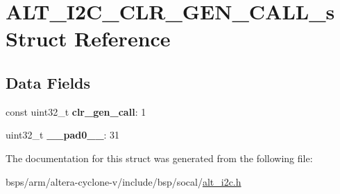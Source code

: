 \hypertarget{structALT__I2C__CLR__GEN__CALL__s}{}\section{A\+L\+T\+\_\+\+I2\+C\+\_\+\+C\+L\+R\+\_\+\+G\+E\+N\+\_\+\+C\+A\+L\+L\+\_\+s Struct Reference}
\label{structALT__I2C__CLR__GEN__CALL__s}
\subsection*{Data Fields}
\begin{DoxyCompactItemize}
\item 
\mbox{\label{structALT__I2C__CLR__GEN__CALL__s_a62dce015df2ae97b914fd4aa50d164a5}} 
const uint32\+\_\+t {\bfseries clr\+\_\+gen\+\_\+call}\+: 1
\item 
\mbox{\label{structALT__I2C__CLR__GEN__CALL__s_a10b2d513be1520bf4e584a13ad630fb5}} 
uint32\+\_\+t {\bfseries \+\_\+\+\_\+pad0\+\_\+\+\_\+}\+: 31
\end{DoxyCompactItemize}


The documentation for this struct was generated from the following file\+:\begin{DoxyCompactItemize}
\item 
bsps/arm/altera-\/cyclone-\/v/include/bsp/socal/\mbox{\hyperlink{socal_2alt__i2c_8h}{alt\+\_\+i2c.\+h}}\end{DoxyCompactItemize}
